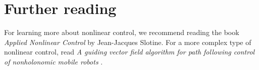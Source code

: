 \section{Further reading}

For learning more about nonlinear control, we recommend reading the book
\textit{Applied Nonlinear Control} by Jean-Jacques Slotine. For a more complex
type of nonlinear control, read \textit{A guiding vector field algorithm for
path following control of nonholonomic mobile robots} \cite{bib:gvf}.
